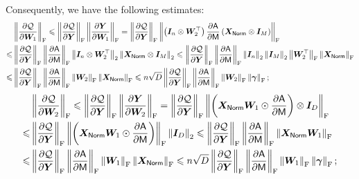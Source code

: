 Consequently, we have the following estimates:
\begin{align*}
    &\norm{\frac{\partial \cQ}{\partial\bW_{1}}}_\rF
    \leq\norm{\frac{\partial \cQ}{\partial\bY}}_\rF\norm{\frac{\partial \bY}{\partial\bW_{1}}}_\rF
    =\norm{\frac{\partial \cQ}{\partial\bY}}_\rF\norm{\left(\bI_{n}\otimes\bW_2^\top\right)\frac{\partial\ASA}{\partial\MSA}\left(\bX_{\LN}\otimes\bI_M\right)}_\rF\\
    \leq&\norm{\frac{\partial \cQ}{\partial\bY}}_\rF\norm{\frac{\partial\ASA}{\partial\MSA}}_\rF\norm{\bI_{n}\otimes\bW_2^\top}_2\norm{\bX_{\LN}\otimes\bI_M}_2
    \leq\norm{\frac{\partial \cQ}{\partial\bY}}_\rF\norm{\frac{\partial\ASA}{\partial\MSA}}_\rF\norm{\bI_{n}}_2\norm{\bI_M}_2\norm{\bW_2^\top}_\rF\norm{\bX_{\LN}}_\rF
    \\\leq&\norm{\frac{\partial \cQ}{\partial\bY}}_\rF\norm{\frac{\partial\ASA}{\partial\MSA}}_\rF\norm{\bW_2}_\rF\norm{\bX_{\LN}}_\rF\leq n\sqrt{D}\norm{\frac{\partial \cQ}{\partial\bY}}_\rF\norm{\frac{\partial\ASA}{\partial\MSA}}_\rF\norm{\bW_2}_\rF\norm{\bgamma}_\rF;
\end{align*}
\begin{align*}
    &\norm{\frac{\partial \cQ}{\partial\bW_{2}}}_\rF
    \leq\norm{\frac{\partial \cQ}{\partial\bY}}_\rF\norm{\frac{\partial \bY}{\partial\bW_{2}}}_\rF
    =\norm{\frac{\partial \cQ}{\partial\bY}}_\rF\norm{\left(\bX_{\LN}\bW_1\odot\frac{\partial\ASA}{\partial\MSA}\right)\otimes\bI_D}_\rF\\
    \leq&\norm{\frac{\partial \cQ}{\partial\bY}}_\rF\norm{\left(\bX_{\LN}\bW_1\odot\frac{\partial\ASA}{\partial\MSA}\right)}_\rF\norm{\bI_D}_2
    \leq\norm{\frac{\partial \cQ}{\partial\bY}}_\rF\norm{\frac{\partial\ASA}{\partial\MSA}}_\rF\norm{\bX_{\LN}\bW_1}_\rF
    \\\leq&\norm{\frac{\partial \cQ}{\partial\bY}}_\rF\norm{\frac{\partial\ASA}{\partial\MSA}}_\rF\norm{\bW_1}_\rF\norm{\bX_{\LN}}_\rF\leq n\sqrt{D}\norm{\frac{\partial \cQ}{\partial\bY}}_\rF\norm{\frac{\partial\ASA}{\partial\MSA}}_\rF\norm{\bW_1}_\rF\norm{\bgamma}_\rF;
\end{align*}
